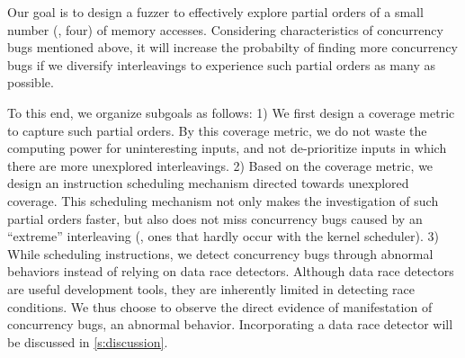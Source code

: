


%
Our goal is to design a fuzzer to effectively explore partial orders
of a small number (\eg, four) of memory accesses.
%
Considering characteristics of concurrency bugs mentioned above, it
will increase the probabilty of finding more concurrency bugs if we
diversify interleavings to experience such partial orders as many as
possible.

To this end, we organize subgoals as follows:
%
1) We first design a coverage metric to capture such partial orders.
By this coverage metric, we do not waste the computing power for
uninteresting inputs, and not de-prioritize inputs in which there are
more unexplored interleavings.
%
2) Based on the coverage metric, we design an instruction scheduling
mechanism directed towards unexplored coverage.
%
This scheduling mechanism not only makes the investigation of such
partial orders faster, but also does not miss concurrency bugs caused
by an ``extreme'' interleaving (\ie, ones that hardly occur with the
kernel scheduler).
%
3) While scheduling instructions, we detect concurrency bugs through
abnormal behaviors instead of relying on data race detectors.
%
Although data race detectors are useful development tools, they are
inherently limited in detecting race conditions.
%
We thus choose to observe the direct evidence of manifestation of
concurrency bugs, an abnormal behavior.
%
Incorporating a data race detector will be discussed in
\autoref{s:discussion}.



